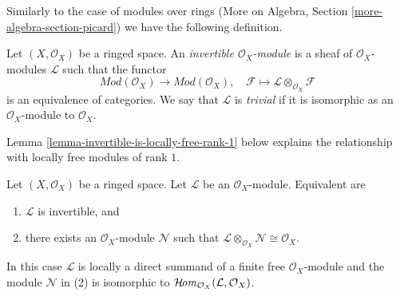 \noindent
Similarly to the case of modules over rings
(More on Algebra, Section \ref{more-algebra-section-picard})
we have the following definition.

\begin{definition}
\label{definition-invertible}
Let $(X, \mathcal{O}_X)$ be a ringed space. An
{\it invertible $\mathcal{O}_X$-module} is a sheaf
of $\mathcal{O}_X$-modules $\mathcal{L}$ such that
the functor
$$
\textit{Mod}(\mathcal{O}_X) \longrightarrow \textit{Mod}(\mathcal{O}_X),\quad
\mathcal{F} \longmapsto \mathcal{L} \otimes_{\mathcal{O}_X} \mathcal{F}
$$
is an equivalence of categories. We say that $\mathcal{L}$ is
{\it trivial} if it is isomorphic as an $\mathcal{O}_X$-module
to $\mathcal{O}_X$.
\end{definition}

\noindent
Lemma \ref{lemma-invertible-is-locally-free-rank-1}
below explains the relationship with locally free modules
of rank $1$.

\begin{lemma}
\label{lemma-invertible}
Let $(X, \mathcal{O}_X)$ be a ringed space. Let $\mathcal{L}$
be an $\mathcal{O}_X$-module. Equivalent are
\begin{enumerate}
\item $\mathcal{L}$ is invertible, and
\item there exists an $\mathcal{O}_X$-module $\mathcal{N}$
such that
$\mathcal{L} \otimes_{\mathcal{O}_X} \mathcal{N} \cong \mathcal{O}_X$.
\end{enumerate}
In this case $\mathcal{L}$ is locally a direct summand of a finite free
$\mathcal{O}_X$-module and the module $\mathcal{N}$ in (2) is isomorphic to
$\mathop{\mathcal{H}\!\mathit{om}}\nolimits_{\mathcal{O}_X}(\mathcal{L}, \mathcal{O}_X)$.
\end{lemma}


